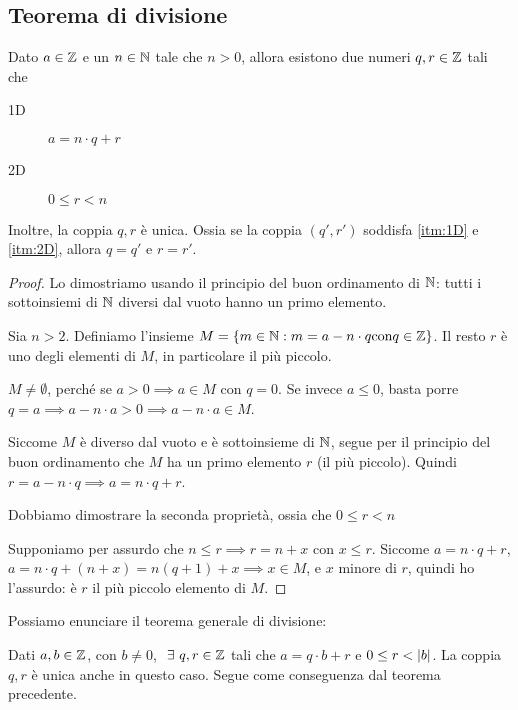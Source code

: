 \subsection{Teorema di divisione}
\begin{theorem}
Dato $a \in \mathbb{Z}$ e un $n \in \mathbb{N}$ tale che $n > 0$, allora esistono due numeri $q, r \in \mathbb{Z}$ tali che
\begin{description}
    \item[1D\label{itm:1D}] $a = n \cdot q + r$
    \item[2D\label{itm:2D}] $0 \le r < n$
\end{description}
\end{theorem}
Inoltre, la coppia $q, r$ \`e unica. Ossia se la coppia $(q', r')$ soddisfa \ref{itm:1D} e \ref{itm:2D}, allora $q = q'$ e $r = r'$.
\begin{proof}
Lo dimostriamo usando il principio del buon ordinamento di $\mathbb{N}$: tutti i sottoinsiemi di $\mathbb{N}$ diversi dal vuoto hanno un primo elemento.

Sia $n > 2$. Definiamo l'insieme $M = \{ m \in \mathbb{N} : m = a - n \cdot q\text{con} q \in \mathbb{Z} \}$. Il resto $r$ \`e uno degli elementi di $M$, in particolare il pi\`u piccolo.

$M \neq \emptyset$, perch\'e se $a > 0 \implies a \in M$ con $q = 0$. Se invece $a \le 0$, basta porre $q = a \implies a - n \cdot a > 0 \implies a - n \cdot a \in M$.


Siccome $M$ \`e diverso dal vuoto e \`e sottoinsieme di $\mathbb{N}$, segue per il principio del buon ordinamento che $M$ ha un primo elemento $r$ (il pi\`u piccolo). Quindi $r = a - n \cdot q \implies a = n \cdot q + r$.

Dobbiamo dimostrare la seconda propriet\`a, ossia che $0 \le r < n$

Supponiamo per assurdo che $n \le r \implies r = n + x$ con $x \le r$. Siccome $a = n \cdot q + r$, $a = n \cdot q + (n + x) = n (q + 1) + x \implies x \in M$, e $x$ minore di $r$, quindi ho l'assurdo: \`e $r$ il pi\`u piccolo elemento di $M$.
\end{proof}
Possiamo enunciare il teorema generale di divisione:
\begin{theorem}
Dati $a, b \in \mathbb{Z}$, con $b \neq 0$, $\exists q, r \in \integers$ tali che $a = q \cdot b + r$ e $0 \le r < \left\lvert{b}\right\rvert$. La coppia $q, r$ \`e unica anche in questo caso. Segue come conseguenza dal teorema precedente.
\end{theorem}

